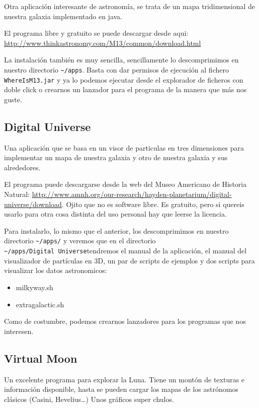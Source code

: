 Otra aplicación interesante de astronomía, se trata de un mapa
tridimensional de nuestra galaxia implementado en java.

El programa libre y gratuito se puede descargar desde aqui:
\url{http://www.thinkastronomy.com/M13/common/download.html}

La instalación también es muy sencilla, sencillamente lo descomprimimos
en nuestro directorio \texttt{\textasciitilde{}/apps}. Basta con dar
permisos de ejecución al fichero \texttt{WhereIsM13.jar} y ya lo podemos
ejecutar desde el explorador de ficheros con doble click o crearnos un
lanzador para el programa de la manera que más nos guste.

\subsection{Digital Universe}\label{digital-universe}

Una aplicación que se basa en un visor de particulas en tres dimensiones
para implementar un mapa de nuestra galaxia y otro de nuestra galaxia y
sus alrededores.

El programa puede descargarse desde la web del Museo Americano de
Historia Natural:
\url{http://www.amnh.org/our-research/hayden-planetarium/digital-universe/download}.
Ojito que no es software libre. Es gratuito, pero si quereis usarlo para
otra cosa distinta del uso personal hay que leerse la licencia.

Para instalarlo, lo mismo que el anterior, los descomprimimos en nuestro
directorio \texttt{\textasciitilde{}/apps/} y veremos que en el
directorio \texttt{\textasciitilde{}/apps/Digital\ Universe}tendremos el
manual de la aplicación, el manual del visualizador de partículas en 3D,
un par de scripts de ejemplos y dos scripts para visualizar los datos
astronomicos:

\begin{itemize}
\item
  milkyway.sh
\item
  extragalactic.sh
\end{itemize}

Como de costumbre, podemos crearnos lanzadores para los programas que
nos interesen.

\subsection{Virtual Moon}\label{virtual-moon}

Un excelente programa para explorar la Luna. Tiene un montón de texturas
e información disponible, hasta se pueden cargar los mapas de los
astrónomos clásicos (Casini, Hevelius\ldots{}) Unos gráficos super
chulos.

